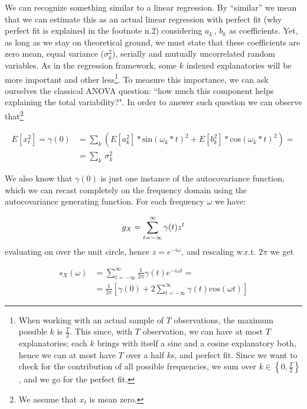 \documentclass[12pt]{article} %
\begin{document}
We can recognize something similar to a linear regression. By ``similar'' we mean that we can estimate this as an actual linear regression with perfect fit (why perfect fit is explained in the footnote n.2) considering $a_k\,,\,b_k$ as coefficients. Yet, as long as we stay on theoretical ground, we must state that these coefficients are zero mean, equal variance ($\sigma_k^2$), serially and mutually uncorrelated random variables. As in the regression framework, some $k$ indexed explanatories will be more important and other less\footnote{
When working with an actual sample of $T$ observations, the maximum possible $k$ is $\frac{T}{2}$. This since, with $T$ observation, we can have at most $T$ explanatories; each $k$ brings with itself a sine and a cosine explanatory both, hence we can at most have $T$ over a half $k$s, and perfect fit. Since we want to check for the contribution of all possible frequencies, we sum over $k\in\left\{0,\frac{T}{2}\right\}$, and we go for the perfect fit.}. To measure this importance, we can ask ourselves the classical ANOVA question: ``how much this component helps explaining the total variability?". In order to answer such question we can observe that\footnote{We assume that $x_t$ is mean zero.}

\begin{equation}
\begin{aligned}
E[x_t^2]=\gamma(0)&=\sum_k(E[a_k^2]*\text{sin}(\omega_k*t)^2+E[b_k^2]*\text{cos}(\omega_k*t)^2)=\\
&=\sum_k\,\sigma_k^2
\end{aligned}
\end{equation}

We also know that $\gamma(0)$ is just one instance of the autocovariance function, which we can recast completely on the frequency domain using the autocovariance generating function. For each frequency $\omega$ we have:

\begin{equation}
g_X=\sum\limits_{t=-\infty}^{\infty} \gamma(t)z^t \\
\end{equation}evaluating on over the unit circle, hence $z=e^{-i\omega}$, and rescaling w.r.t. $2\pi$ we get

\begin{equation}
\begin{aligned}
s_X(\omega)&=\sum\limits_{t=-\infty}^{\infty} \frac{1}{2\pi} \gamma(t)e^{-i\omega t}=\\
&=\frac{1}{2\pi}\left[\gamma(0)+2\sum\limits_{t=-\infty}^{\infty} \gamma(t)\text{cos}(\omega t)\right]
\end{aligned}
\end{equation}
\end{document}
